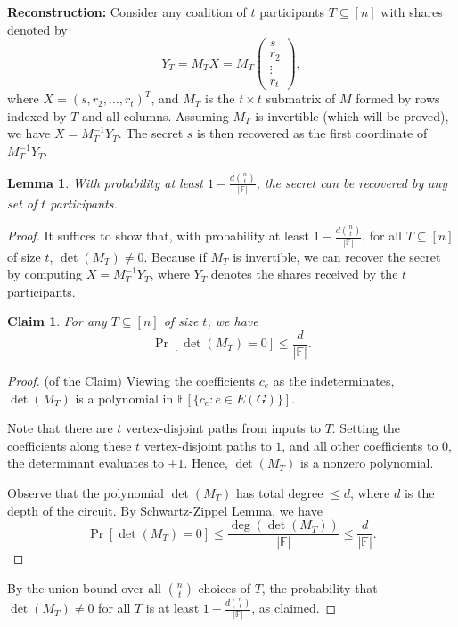 \documentclass[11pt]{article}
\newtheorem{lemma}{Lemma}
\newtheorem{claim}{Claim}
\begin{document}
\textbf{Reconstruction:} Consider any coalition of $t$ participants $T \subseteq [n]$ with shares
denoted by
\[
Y_T = M_T X = M_T \begin{pmatrix}
s \\
r_2 \\
\vdots \\
r_t
\end{pmatrix},
\]
where $X = (s, r_2, \ldots, r_t)^T$, and 
$M_T$ is the $t \times t$ submatrix of $M$ formed by rows indexed by $T$ and all columns.
Assuming $M_T$ is invertible (which will be proved), we have $X = M_T^{-1} Y_T$. The secret $s$ is then recovered as the first coordinate of $M_T^{-1} Y_T$.


\begin{lemma}
\label{lem:recover}
With probability at least $1 - \frac{d \binom{n}{t}}{|\mathbb{F}|}$, the secret can be recovered by any set of $t$ participants.
\end{lemma}
\begin{proof}
It suffices to show that, with probability at least $1 - \frac{d \binom{n}{t}}{|\mathbb{F}|}$, for all $T \subseteq [n]$ of size $t$, $\det(M_T) \neq 0$.
Because if $M_T$ is invertible, we can recover the secret by computing $X = M_T^{-1} Y_T$, where $Y_T$ denotes the shares received by the $t$ participants.

\begin{claim} For any $T \subseteq [n]$ of size $t$, we have
\[
\Pr[\det(M_T) = 0] \le \frac{d}{|\mathbb{F}|}.
\]
\end{claim}
\begin{proof} (of the Claim) Viewing the coefficients $c_e$ as the indeterminates, $\det(M_T)$ is a polynomial in $\mathbb{F}[\{c_e : e \in E(G)\}]$.

Note that there are $t$ vertex-disjoint paths from inputs to $T$. Setting the coefficients along these $t$ vertex-disjoint paths to $1$, and all other coefficients to $0$, the determinant evaluates to $\pm 1$. Hence, $\det(M_T)$ is a nonzero polynomial.

Observe that the polynomial $\det(M_T)$ has total degree $\le d$, where $d$ is the depth of the circuit. By Schwartz-Zippel Lemma, we have
\[
\Pr[\det(M_T) = 0] \le \frac{\deg(\det(M_T))}{|\mathbb{F}|} \le \frac{d}{|\mathbb{F}|}.
\]
\end{proof}

By the union bound over all $\binom{n}{t}$ choices of $T$, the probability that $\det(M_T) \neq 0$ for all $T$ is at least $1 - \frac{d \binom{n}{t}}{|\mathbb{F}|}$, as claimed.
\end{proof}
\end{document}
